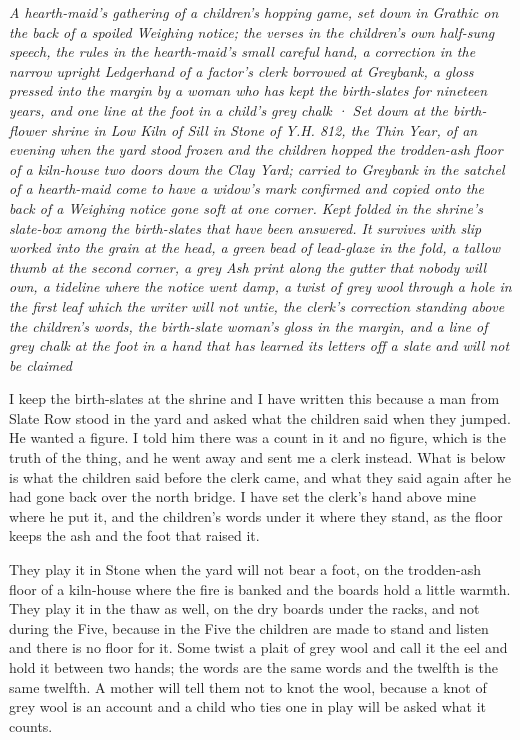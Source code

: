 \documentclass{design/chronicle}
\begin{document}
\clearpage{}
{\centering\FellFont\itshape\footnotesize\color{faded} A hearth-maid’s gathering of a children’s hopping game, set down in Grathic on the back of a spoiled Weighing notice; the verses in the children’s own half-sung speech, the rules in the hearth-maid’s small careful hand, a correction in the narrow upright Ledgerhand of a factor’s clerk borrowed at Greybank, a gloss pressed into the margin by a woman who has kept the birth-slates for nineteen years, and one line at the foot in a child’s grey chalk · Set down at the birth-flower shrine in Low Kiln of Sill in Stone of Y.H. 812, the Thin Year, of an evening when the yard stood frozen and the children hopped the trodden-ash floor of a kiln-house two doors down the Clay Yard; carried to Greybank in the satchel of a hearth-maid come to have a widow’s mark confirmed and copied onto the back of a Weighing notice gone soft at one corner. Kept folded in the shrine’s slate-box among the birth-slates that have been answered. It survives with slip worked into the grain at the head, a green bead of lead-glaze in the fold, a tallow thumb at the second corner, a grey Ash print along the gutter that nobody will own, a tideline where the notice went damp, a twist of grey wool through a hole in the first leaf which the writer will not untie, the clerk’s correction standing above the children’s words, the birth-slate woman’s gloss in the margin, and a line of grey chalk at the foot in a hand that has learned its letters off a slate and will not be claimed\par}\medskip
I keep the birth-slates at the shrine and I have written this because a man from Slate Row stood in the yard and asked what the children said when they jumped. He wanted a figure. I told him there was a count in it and no figure, which is the truth of the thing, and he went away and sent me a clerk instead. What is below is what the children said before the clerk came, and what they said again after he had gone back over the north bridge. I have set the clerk’s hand above mine where he put it, and the children’s words under it where they stand, as the floor keeps the ash and the foot that raised it.

They play it in Stone when the yard will not bear a foot, on the trodden-ash floor of a kiln-house where the fire is banked and the boards hold a little warmth. They play it in the thaw as well, on the dry boards under the racks, and not during the Five, because in the Five the children are made to stand and listen and there is no floor for it. Some twist a plait of grey wool and call it the eel and hold it between two hands; the words are the same words and the twelfth is the same twelfth. A mother will tell them not to knot the wool, because a knot of grey wool is an account and a child who ties one in play will be asked what it counts.
\end{document}
